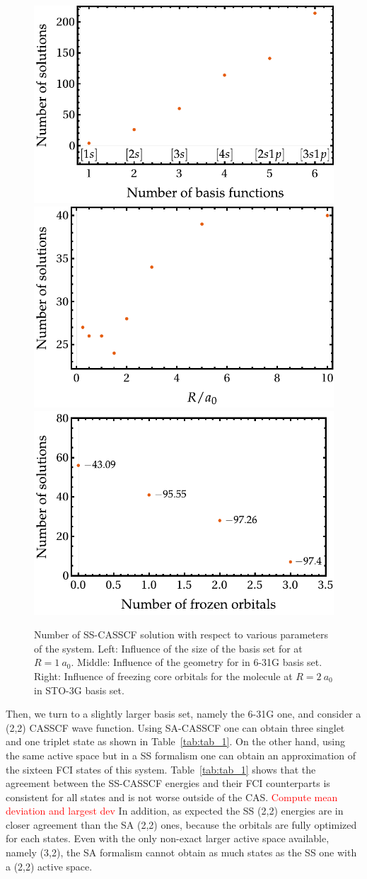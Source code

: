\documentclass[aps,prb,reprint,showkeys,superscriptaddress]{revtex4-1}
\newcommand{\todo}[1]{\textcolor{red}{#1}}
\begin{document}
\begin{figure}
  \includegraphics[width=0.3\linewidth]{Figures/fig_2a.pdf}
  \hspace{0.03\linewidth}
  \includegraphics[width=0.3\linewidth]{Figures/fig_2b.pdf}
  \hspace{0.03\linewidth}
  \includegraphics[width=0.3\linewidth]{Figures/fig_2c.pdf}
  \caption{Number of SS-CASSCF solution with respect to various parameters of the system. Left: Influence of the size of the basis set for  at $R=1~a_0$. Middle: Influence of the geometry for  in 6-31G basis set. Right: Influence of freezing core orbitals for the  molecule at $R=2~a_0$ in STO-3G basis set. \label{fig:fig_2}}
\end{figure}

Then, we turn to a slightly larger basis set, namely the 6-31G one, \cite{Ditchfield_1971} and consider a (2,2) CASSCF wave function.
Using SA-CASSCF one can obtain three singlet and one triplet state as shown in Table~\ref{tab:tab_1}.
On the other hand, using the same active space but in a SS formalism one can obtain an approximation of the sixteen FCI states of this system.
Table~\ref{tab:tab_1} shows that the agreement between the SS-CASSCF energies and their FCI counterparts is consistent for all states and is not worse outside of the CAS.
\todo{Compute mean deviation and largest dev}
In addition, as expected the SS (2,2) energies are in closer agreement than the SA (2,2) ones, because the orbitals are fully optimized for each states.
Even with the only non-exact larger active space available, namely (3,2), the SA formalism cannot obtain as much states as the SS one with a (2,2) active space.
\end{document}
